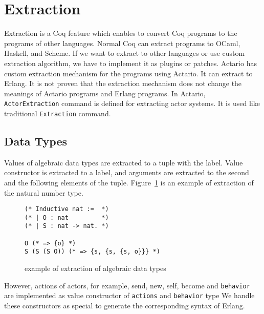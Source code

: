 \section{Extraction}
\label{sec:extraction}

Extraction is a Coq feature which enables to convert Coq programs to the programs of other languages.
Normal Coq can extract programs to OCaml, Haskell, and Scheme.
If we want to extract to other languages or use custom extraction algorithm, we have to implement it as plugins or patches.
Actario has custom extraction mechanism for the programs using Actario.
It can extract to Erlang.
It is not proven that the extraction mechanism does not change the meanings of Actario programs and Erlang programs.
In Actario, \lstinline|ActorExtraction| command is defined for extracting actor systems.
It is used like traditional \lstinline|Extraction| command.

\subsection{Data Types}

Values of algebraic data types are extracted to a tuple with the label.
Value constructor is extracted to a label, and arguments are extracted to the second and the following elements of the tuple.
Figure~\ref{coq:adt} is an example of extraction of the natural number type.

\begin{figure}[t]
\begin{lstlisting}
(* Inductive nat :=  *)
(* | O : nat         *)
(* | S : nat -> nat. *)

O (* => {o} *)
S (S (S O)) (* => {s, {s, {s, o}}} *)
\end{lstlisting}
\caption{example of extraction of algebraic data types}\label{coq:adt}
\end{figure}

However, actions of actors, for example, \textsf{send}, \textsf{new}, \textsf{self}, \textsf{become} and \texttt{behavior} are implemented as value constructor of \texttt{actions} and \texttt{behavior} type
We handle these constructors as special to generate the corresponding syntax of Erlang.


